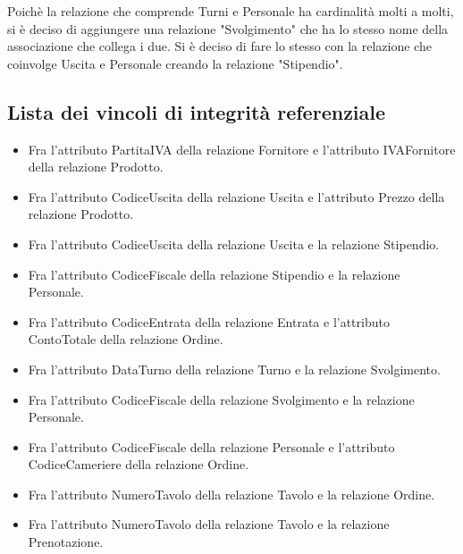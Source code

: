 \noindent
Poichè la relazione che comprende Turni e Personale ha cardinalità molti a molti, si è deciso di aggiungere una relazione "Svolgimento" che ha lo stesso nome della associazione che collega i due. \newline
Si è deciso di fare lo stesso con la relazione che coinvolge Uscita e Personale creando la relazione "Stipendio".

\subsection{Lista dei vincoli di integrità referenziale}
\begin{itemize}
    \item Fra l'attributo PartitaIVA della relazione Fornitore e l'attributo IVAFornitore della relazione Prodotto.
    \item Fra l'attributo CodiceUscita della relazione Uscita e l'attributo Prezzo della relazione Prodotto.
    \item Fra l'attributo CodiceUscita della relazione Uscita e la relazione Stipendio.
    \item Fra l'attributo CodiceFiscale della relazione Stipendio e la relazione Personale.
    \item Fra l'attributo CodiceEntrata della relazione Entrata e l'attributo ContoTotale della relazione Ordine.
    \item Fra l'attributo DataTurno della relazione Turno e la relazione Svolgimento.
    \item Fra l'attributo CodiceFiscale della relazione Svolgimento e la relazione Personale.
    \item Fra l'attributo CodiceFiscale della relazione Personale e l'attributo CodiceCameriere della relazione Ordine.
    \item Fra l'attributo NumeroTavolo della relazione Tavolo e la relazione Ordine.
    \item Fra l'attributo NumeroTavolo della relazione Tavolo e la relazione Prenotazione.
\end{itemize}
